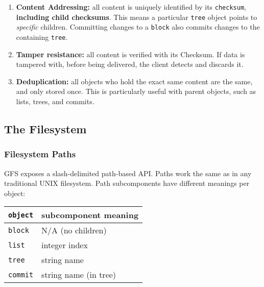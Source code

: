 \documentclass{sig-alternate}
\begin{document}
\begin{enumerate}
  \item \textbf{Content Addressing:} all content is uniquely identified by its
        \texttt{checksum}, \textbf{including child checksums}. This means a
        particular \texttt{tree} object points to \textit{specific} children.
        Committing changes to a \texttt{block} also commits changes to the
        containing \texttt{tree}.
  \item \textbf{Tamper resistance:} all content is verified with its Checksum.
        If data is tampered with, before being delivered, the client
        detects and discards it.
  \item \textbf{Deduplication:} all objects who hold the exact same content
        are the same, and only stored once. This is particularly useful with
        parent objects, such as lists, trees, and commits.
\end{enumerate}


\subsection{The Filesystem}

\subsubsection{Filesystem Paths}

GFS exposes a slash-delimited path-based API. Paths work the same as in any
traditional UNIX filesystem. Path subcomponents have different meanings per
object:

\begin{center}
\begin{tabular}{ll}
  \texttt{object} & subcomponent meaning \\
  \hline
  \hline
  \texttt{block}  & N/A (no children) \\
  \texttt{list}   & integer index \\
  \texttt{tree}   & string name \\
  \texttt{commit} & string name (in tree) \\
\end{tabular}
\end{center}
\end{document}
